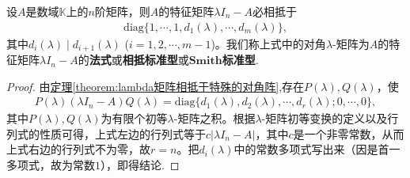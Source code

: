 \documentclass[../../main.tex]{subfiles}%
\begin{document}
\begin{corollary}\label{corollary:特征矩阵的法式}
设$A$是数域$\mathbb{K}$上的$n$阶矩阵，则$A$的特征矩阵$\lambda I_n - A$必相抵于
\begin{align*}
\mathrm{diag}\{1,\cdots,1,d_1(\lambda),\cdots,d_m(\lambda)\},
\end{align*}
其中$d_i(\lambda)\mid d_{i + 1}(\lambda)$ ($i = 1,2,\cdots,m - 1$)。我们称上式中的对角$\lambda$-矩阵为$A$的特征矩阵$\lambda I_n-A$的\textbf{法式}或\textbf{相抵标准型}或$\mathbf{Smith}$\textbf{标准型}. 
\end{corollary}
\begin{proof}

由\hyperref[theorem:lambda矩阵相抵于特殊的对角阵]{定理\ref{theorem:lambda矩阵相抵于特殊的对角阵}},存在$P(\lambda),Q(\lambda)$，使
\begin{align*}
P(\lambda)(\lambda I_n - A)Q(\lambda)=\mathrm{diag}\{d_1(\lambda),d_2(\lambda),\cdots,d_r(\lambda);0,\cdots,0\},
\end{align*}
其中$P(\lambda),Q(\lambda)$为有限个初等$\lambda$-矩阵之积。根据$\lambda$-矩阵初等变换的定义以及行列式的性质可得，上式左边的行列式等于$c|\lambda I_n - A|$，其中$c$是一个非零常数，从而上式右边的行列式不为零，故$r = n$。把$d_i(\lambda)$中的常数多项式写出来（因是首一多项式，故为常数$1$），即得结论.

\end{proof}
\end{document}

